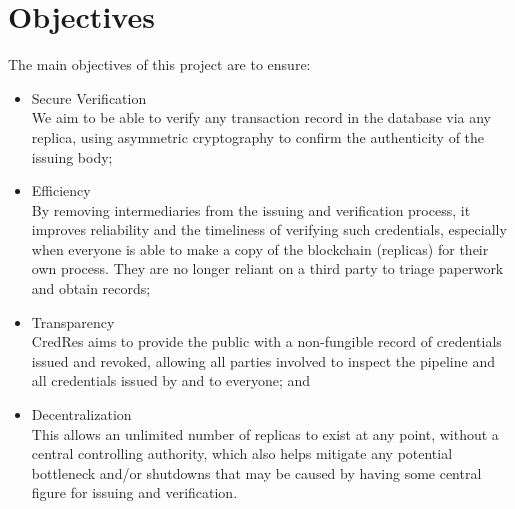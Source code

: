 \section{Objectives}
The main objectives of this project are to ensure:
\begin{itemize}
    \item Secure Verification \\
        We aim to be able to verify any transaction record in the database via any replica, using
        asymmetric cryptography to confirm the authenticity of the issuing body;
    \item Efficiency \\
        By removing intermediaries from the issuing and verification process, it improves
        reliability and the timeliness of verifying such credentials, especially when everyone is
        able to make a copy of the blockchain (replicas) for their own process. They are no longer
        reliant on a third party to triage paperwork and obtain records;
    \item Transparency \\
        CredRes aims to provide the public with a non-fungible record of credentials issued and
        revoked, allowing all parties involved to inspect the pipeline and all credentials issued by
        and to everyone; and
    \item Decentralization \\
        This allows an unlimited number of replicas to exist at any point, without a central
        controlling authority, which also helps mitigate any potential bottleneck and/or shutdowns
        that may be caused by having some central figure for issuing and verification.
\end{itemize}


